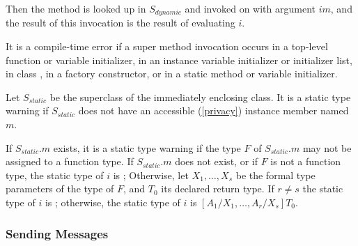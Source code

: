 \documentclass{article}
\begin{document}
\LMHash{}
Then the method  is looked up in $S_{dynamic}$ and invoked on \THIS{} with argument $im$,
and the result of this invocation is the result of evaluating $i$.

%

\LMHash{}
It is a compile-time error if a super method invocation occurs in a top-level function or variable initializer,
in an instance variable initializer or initializer list,
in class ,
in a factory constructor,
or in a static method or variable initializer.

\LMHash{}
Let $S_{static}$ be the superclass of the immediately enclosing class.
It is a static type warning if $S_{static}$ does not have an accessible (\ref{privacy}) instance member named $m$.

\LMHash{}
If $S_{static}.m$ exists, it is a static type warning if the type $F$ of $S_{static}.m$ may not be assigned to a function type.
If $S_{static}.m$ does not exist, or if $F$ is not a function type, the static type of $i$ is \DYNAMIC{};
Otherwise, let $X_1, \ldots, X_s$ be the formal type parameters of the type of $F$,
and $T_0$ its declared return type.
If $r \not= s$ the static type of $i$ is \DYNAMIC{};
otherwise, the static type of $i$ is $[A_1/X_1, \ldots, A_r/X_s]T_0$.




\subsubsection{Sending Messages}
\end{document}
